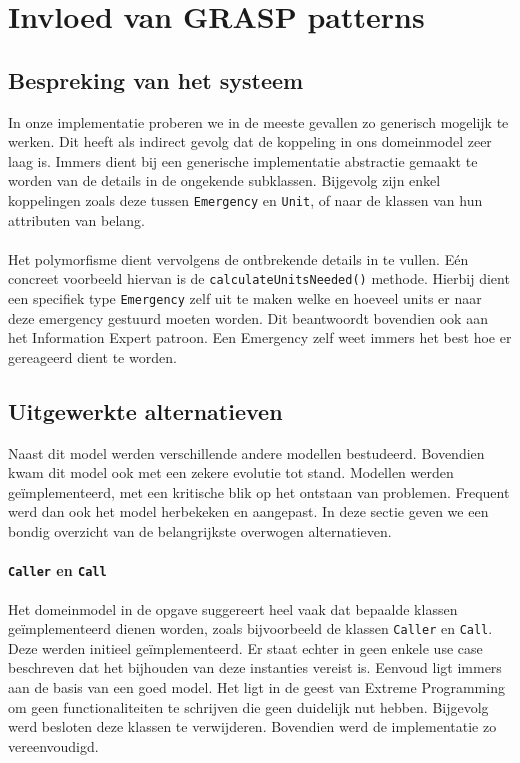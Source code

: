 \section{Invloed van GRASP patterns}
\label{grasp}
\subsection{Bespreking van het systeem}
In onze implementatie proberen we in de meeste gevallen zo generisch mogelijk te werken. Dit heeft als indirect gevolg dat de koppeling in ons domeinmodel zeer laag is. Immers dient bij een generische implementatie abstractie gemaakt te worden van de details in de ongekende subklassen. Bijgevolg zijn enkel koppelingen zoals deze tussen \verb+Emergency+ en \verb+Unit+, of naar de klassen van hun attributen van belang.
\paragraph{}
Het polymorfisme dient vervolgens de ontbrekende details in te vullen. E\'en concreet voorbeeld hiervan is de \verb+calculateUnitsNeeded()+ methode. Hierbij dient een specifiek type \verb+Emergency+ zelf uit te maken welke en hoeveel units er naar deze emergency gestuurd moeten worden. Dit beantwoordt bovendien ook aan het Information Expert patroon. Een Emergency zelf weet immers het best hoe er gereageerd dient te worden.
\paragraph{}
\subsection{Uitgewerkte alternatieven}
Naast dit model werden verschillende andere modellen bestudeerd. Bovendien kwam dit model ook met een zekere evolutie tot stand. Modellen werden ge\"implementeerd, met een kritische blik op het ontstaan van problemen. Frequent werd dan ook het model herbekeken en aangepast. In deze sectie geven we een bondig overzicht van de belangrijkste overwogen alternatieven.
\paragraph{\texttt{Caller} en \texttt{Call}}
Het domeinmodel in de opgave suggereert heel vaak dat bepaalde klassen ge\"implementeerd dienen worden, zoals bijvoorbeeld de klassen \verb+Caller+ en \verb+Call+. Deze werden initieel ge\"implementeerd. Er staat echter in geen enkele use case beschreven dat het bijhouden van deze instanties vereist is. Eenvoud ligt immers aan de basis van een goed model. Het ligt in de geest van Extreme Programming om geen functionaliteiten te schrijven die geen duidelijk nut hebben. Bijgevolg werd besloten deze klassen te verwijderen. Bovendien werd de implementatie zo vereenvoudigd.
